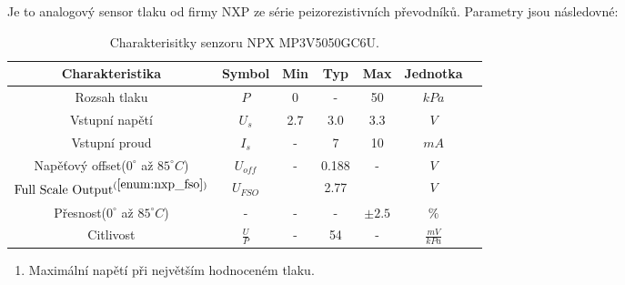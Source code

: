 Je to analogový sensor tlaku od firmy NXP ze série peizorezistivních převodníků. Parametry jsou následovné:
\begin{table}[H]
    \label{tab:nxp_properties}
    \caption{Charakterisitky senzoru NPX MP3V5050GC6U. \cite{cite:NXP}}
    \begin{ctucolortab}
        \begin{tabular}{ccccccc}
            \toprule
            Charakteristika                                         & Symbol        & Min & Typ   & Max        & Jednotka         & \\ \midrule
            Rozsah tlaku                                            & $P$           & 0   & -     & 50         & $kPa$            & \\
            Vstupní napětí                                          & $U_{s}$       & 2.7 & 3.0   & 3.3        & $V$              & \\
            Vstupní proud                                           & $I_{s}$       & -   & 7     & 10         & $mA$             & \\
            Napěťový offset($0^{\circ}$ až $ 85^{\circ}  C $)       & $U_{off}$     & -   & 0.188 & -          & $V$              & \\
            $\textnormal{Full Scale Output}^{(\ref{enum:nxp_fso})}$ & $U_{FSO}$     &     & 2.77  &            & $V$              & \\
            Přesnost($0^{\circ}$ až $ 85^{\circ} C$)                & -             & -   & -     & $\pm 2.5 $ & $\%$             & \\
            Citlivost                                               & $\frac{U}{P}$ & -   & 54    & -          & $\frac{mV}{kPa}$ & \\
            \bottomrule
        \end{tabular}
    \end{ctucolortab}

    \begin{enumerate}
        \item \label{enum:nxp_fso} Maximální napětí při největším hodnoceném tlaku.
    \end{enumerate}
\end{table}

